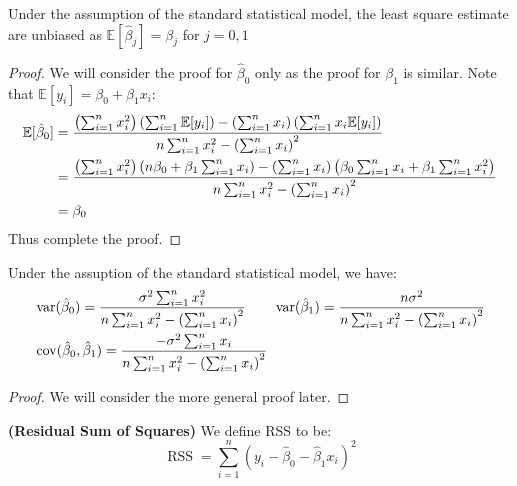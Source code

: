 \begin{proposition}
    Under the assumption of the standard statistical model, the least square estimate are unbiased as $\mathbb{E}[\hat{\beta}_j] = \beta_j$ for $j = 0, 1$
\end{proposition}
\begin{proof}
    We will consider the proof for $\hat{\beta}_0$ only as the proof for $\beta_1$ is similar. Note that $\mathbb{E}[y_i] = \beta_0 + \beta_1 x_i$:
    \begin{equation*}
    \begin{aligned}
        \mathbb{E}[\hat{\beta}_0] &= \frac{\left( \sum^n_{i=1}x_i^2 \right)\left( \sum^n_{i=1} \mathbb{E}[y_i] \right) - \left( \sum^n_{i=1} x_i \right)\left( \sum^n_{i=1}x_i\mathbb{E}[y_i] \right)}{n\sum^n_{i=1}x_i^2 - \left( \sum^n_{i=1}x_i \right)^2} \\
        &= \frac{\left( \sum^n_{i=1}x_i^2 \right)\left( n\beta_0 + \beta_1\sum^n_{i=1} x_i \right) - \left( \sum^n_{i=1} x_i \right)\left( \beta_0\sum^n_{i=1}x_i + \beta_1\sum^n_{i=1}x_i^2 \right)}{n\sum^n_{i=1}x_i^2 - \left( \sum^n_{i=1}x_i \right)^2} \\
        &= \beta_0
    \end{aligned}
    \end{equation*}
    Thus complete the proof.
\end{proof}

\begin{theorem}
    Under the assuption of the standard statistical model, we have:
    \begin{equation*}
    \begin{aligned}
        &\operatorname{var}(\hat{\beta}_0) = \frac{\sigma^2\sum^n_{i=1}x_i^2}{n\sum^n_{i=1}x_i^2 - \left( \sum^n_{i=1}x_i \right)^2}\qquad \operatorname{var}(\hat{\beta}_1) = \frac{n\sigma^2}{n\sum^n_{i=1}x_i^2 - \left( \sum^n_{i=1}x_i \right)^2} \\
        &\operatorname{cov}(\hat{\beta}_0, \hat{\beta}_1) = \frac{-\sigma^2\sum^n_{i=1}x_i}{n\sum^n_{i=1}x_i^2 - \left( \sum^n_{i=1}x_i \right)^2}
    \end{aligned}
    \end{equation*}
\end{theorem}
\begin{proof}
    We will consider the more general proof later. 
\end{proof}

\begin{definition}{\textbf{(Residual Sum of Squares)}}
    We define RSS to be:
    \begin{equation*}
        \operatorname{RSS} = \sum^n_{i=1}(y_i - \hat{\beta}_0 - \hat{\beta}_1x_i)^2
    \end{equation*}
\end{definition}

